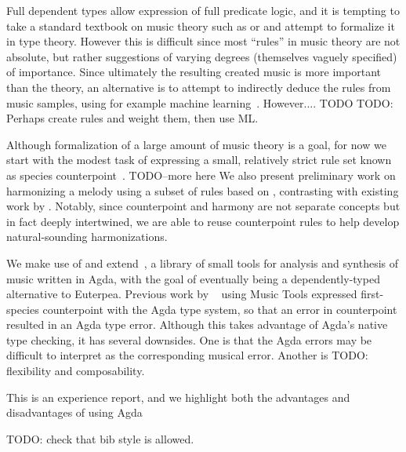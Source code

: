 Full dependent types allow expression of full predicate logic, and it is
tempting to take a standard textbook on music theory such as
\citet{piston-harmony} or \citet{aldwell2018harmony} and attempt to
formalize it in type theory. However this is difficult since most
``rules'' in music theory are not absolute, but rather suggestions of
varying degrees (themselves vaguely specified) of importance. Since
ultimately the resulting created music is more important than the
theory, an alternative is to attempt to indirectly deduce the rules
from music samples, using for example machine
learning~\citep{huang-cp}. However.... TODO
TODO: Perhaps create rules and weight them, then use ML.

Although formalization of a large amount of music theory is a goal,
for now we start with the modest task of expressing a small,
relatively strict rule set known as species
counterpoint~\cite{fux-cp}. TODO--more here
We also present preliminary work on harmonizing a melody using
a subset of rules based on \citet{piston-harmony}, contrasting with
existing work by \citet{koops-fharm}. Notably, since counterpoint and
harmony are not separate concepts but in fact deeply intertwined, we
are able to reuse counterpoint rules to help develop natural-sounding
harmonizations.

We make use of and extend~\cite{MusicTools}, a library of small tools
for analysis and synthesis of music written in Agda, with the goal
of eventually being a dependently-typed alternative to Euterpea. 
Previous work by ~\cite{cong-cp} using Music Tools expressed
first-species counterpoint with the Agda type system, so that an error
in counterpoint resulted in an Agda type error. Although this takes
advantage of Agda's native type checking, it has several
downsides. One is that the Agda errors may be difficult to interpret
as the corresponding musical error. Another is TODO: flexibility and
composability.

This is an experience report, and we highlight both the advantages and
disadvantages of using Agda


TODO: check that bib style is allowed.
